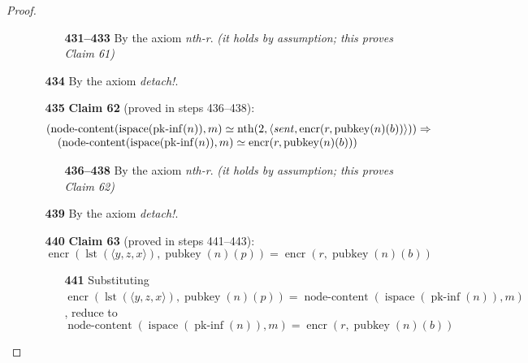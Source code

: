 \documentclass[11pt]{article}
\theoremstyle{plain}
\begin{document}
\begin{proof}
\begin{itemize}[leftmargin=2.8em, itemsep=4pt, parsep=1pt]
\begin{itemize}[leftmargin=2.8em, itemsep=4pt, parsep=1pt]
  \begin{itemize}[leftmargin=2.8em, itemsep=4pt, parsep=1pt]
  \item[\textbf{431--433}] By the axiom \emph{nth-r}.  \emph{(it holds by assumption; this proves Claim 61)}
  \end{itemize}
  \item[\textbf{434}] By the axiom \emph{detach!}.
  \item[\textbf{435}] \textbf{Claim 62} (proved in steps 436--438):
\begin{equation*}
\begin{array}{@{}l@{}} (\operatorname{node\text{-}content}(\operatorname{ispace}(\operatorname{pk\text{-}inf}(n)), m) \simeq \operatorname{nth}(2, \langle \mathit{sent}, \operatorname{encr}(r, \operatorname{pubkey}(n)(b)) \rangle)) \Rightarrow  \\ \quad (\operatorname{node\text{-}content}(\operatorname{ispace}(\operatorname{pk\text{-}inf}(n)), m) \simeq \operatorname{encr}(r, \operatorname{pubkey}(n)(b))) \end{array}
\end{equation*}

  \begin{itemize}[leftmargin=2.8em, itemsep=4pt, parsep=1pt]
  \item[\textbf{436--438}] By the axiom \emph{nth-r}.  \emph{(it holds by assumption; this proves Claim 62)}
  \end{itemize}
  \item[\textbf{439}] By the axiom \emph{detach!}.
  \item[\textbf{440}] \textbf{Claim 63} (proved in steps 441--443):
\begin{equation*}
\operatorname{encr}(\operatorname{lst}(\langle y, z, x \rangle), \operatorname{pubkey}(n)(p)) = \operatorname{encr}(r, \operatorname{pubkey}(n)(b))
\end{equation*}

  \begin{itemize}[leftmargin=2.8em, itemsep=4pt, parsep=1pt]
  \item[\textbf{441}] Substituting $\operatorname{encr}(\operatorname{lst}(\langle y, z, x \rangle), \operatorname{pubkey}(n)(p)) = \operatorname{node\text{-}content}(\operatorname{ispace}(\operatorname{pk\text{-}inf}(n)), m)$, reduce to
\begin{equation*}
\operatorname{node\text{-}content}(\operatorname{ispace}(\operatorname{pk\text{-}inf}(n)), m) = \operatorname{encr}(r, \operatorname{pubkey}(n)(b))
\end{equation*}


\end{itemize}
\end{itemize}
\end{itemize}
\end{proof}
\end{document}
